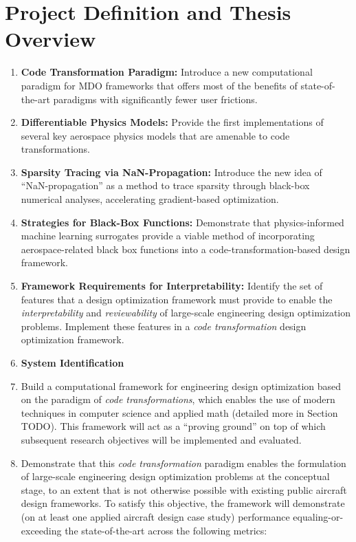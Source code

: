 \documentclass[12pt,vi,oneside]{report}
\begin{document}
    \section{Project Definition and Thesis Overview}
    \label{sec:definition}



    \begin{enumerate}
        \item \textbf{Code Transformation Paradigm:} Introduce a new computational paradigm for MDO frameworks that offers most of the benefits of state-of-the-art paradigms with significantly fewer user frictions.
        \item \textbf{Differentiable Physics Models:} Provide the first implementations of several key aerospace physics models that are amenable to code transformations.
        \item \textbf{Sparsity Tracing via NaN-Propagation:} Introduce the new idea of ``NaN-propagation'' as a method to trace sparsity through black-box numerical analyses, accelerating gradient-based optimization.
        \item \textbf{Strategies for Black-Box Functions:} Demonstrate that physics-informed machine learning surrogates provide a viable method of incorporating aerospace-related black box functions into a code-transformation-based design framework.
        \item \textbf{Framework Requirements for Interpretability:} Identify the set of features that a design optimization framework must provide to enable the \textit{interpretability} and \textit{reviewability} of large-scale engineering design optimization problems. Implement these features in a \textit{code transformation} design optimization framework.
        \item \textbf{System Identification }
        \item Build a computational framework for engineering design optimization based on the paradigm of \textit{code transformations}, which enables the use of modern techniques in computer science and applied math (detailed more in Section TODO). This framework will act as a ``proving ground'' on top of which subsequent research objectives will be implemented and evaluated.
        \item Demonstrate that this \textit{code transformation} paradigm enables the formulation of large-scale engineering design optimization problems at the conceptual stage, to an extent that is not otherwise possible with existing public aircraft design frameworks. To satisfy this objective, the framework will demonstrate (on at least one applied aircraft design case study) performance equaling-or-exceeding the state-of-the-art across the following metrics:

\end{enumerate}
\end{document}
